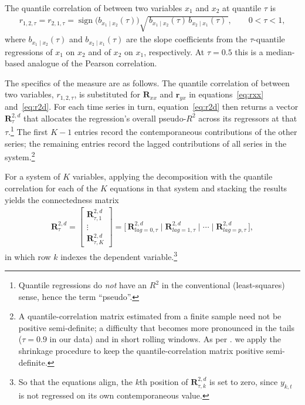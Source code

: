 \documentclass{article}
\begin{document}
The quantile correlation of \textcite{choishin2022} between two variables $x_1$ and
$x_2$ at quantile $\tau$ is
\begin{align}
r_{1,2,\tau}=r_{2,1,\tau}
  =\operatorname{sign}\!\big(b_{x_1\mid x_2}(\tau)\big)
   \sqrt{\,b_{x_1\mid x_2}(\tau)\,b_{x_2\mid x_1}(\tau)\,},
  \qquad 0<\tau<1,
\end{align}
where $b_{x_1\mid x_2}(\tau)$ and $b_{x_2\mid x_1}(\tau)$ are the slope coefficients from
the $\tau$-quantile regressions of $x_1$ on $x_2$ and of $x_2$ on $x_1$, respectively. At
$\tau=0.5$ this is a median-based analogue of the Pearson correlation.

The specifics of the \textcite{shahzadetal} measure are as follows. The quantile correlation of \textcite{choishin2022} between two variables, $r_{1,2,\tau}$, is substituted for $\bm{R}_{xx}$ and $\bm{r}_{yx}$ in equations~\ref{eq:rxx} and~\ref{eq:r2d}. For each time series in turn,
equation~\ref{eq:r2d} then returns a vector $\bm{R}^{2,d}_{\tau}$ that allocates
the regression's overall pseudo-$R^2$ across its regressors at that $\tau$.\footnote{Quantile regressions do \emph{not} have an $R^2$ in the conventional (least-squares) sense, hence the term ``pseudo''.} The first $K-1$ entries
record the contemporaneous contributions of the other series; the remaining
entries record the lagged contributions of all series in the system.\footnote{ A quantile-correlation matrix estimated from a finite sample need not be positive
semi-definite; a difficulty that becomes more pronounced in the tails ($\tau=0.9$ in our
data) and in short rolling windows. As per \textcite{shahzadetal}. we
apply the \textcite{schafer2005} shrinkage procedure to keep the quantile-correlation matrix positive semi-definite. } 


For a system of $K$ variables, applying  the decomposition with the quantile correlation for each of the $K$ equations in that system and stacking the results
yields the connectedness matrix
\begin{align}
\bm{R}_{\tau}^{2,d}
  = \begin{bmatrix}
      \bm{R}_{\tau,1}^{2,d} \\ \vdots \\ \bm{R}_{\tau,K}^{2,d}
    \end{bmatrix}
  = \bigl[\, \bm{R}_{lag=0,\tau}^{2,d} \;\big|\; \bm{R}_{lag=1,\tau}^{2,d}
    \;\big|\; \cdots \;\big|\; \bm{R}_{lag=p,\tau}^{2,d} \,\bigr],
\end{align}
in which row $k$ indexes the dependent variable.\footnote{So that the equations align, the $k$th position
of $\bm{R}_{\tau,k}^{2,d}$ is set to zero, since $y_{k,t}$ is not regressed on its
own contemporaneous value.}   
\end{document}
